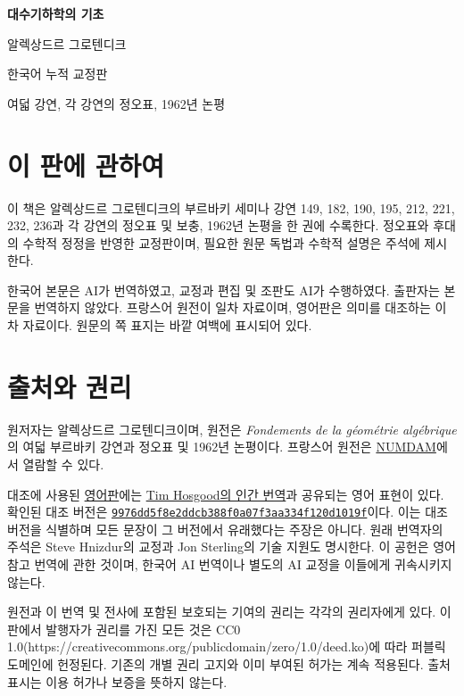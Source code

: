 \documentclass[11pt,twoside,openany]{book}
\numberwithin{equation}{section}
\theoremstyle{plain}
\theoremstyle{definition}
\theoremstyle{remark}
\begin{document}
\frontmatter
\begin{titlepage}
\centering
\vspace*{0.16\textheight}
{\Huge\bfseries 대수기하학의 기초\par}
\vspace{1.2\baselineskip}
{\Large 알렉상드르 그로텐디크\par}
\vfill
{\large 한국어 누적 교정판\par}
\vspace{0.5\baselineskip}
{\normalsize 여덟 강연, 각 강연의 정오표, 1962년 논평\par}
\end{titlepage}
\chapter*{이 판에 관하여}
이 책은 알렉상드르 그로텐디크의 부르바키 세미나 강연 149, 182, 190,
195, 212, 221, 232, 236과 각 강연의 정오표 및 보충, 1962년 논평을
한 권에 수록한다. 정오표와 후대의 수학적 정정을 반영한 교정판이며,
필요한 원문 독법과 수학적 설명은 주석에 제시한다.

한국어 본문은 AI가 번역하였고, 교정과 편집 및 조판도 AI가 수행하였다.
출판자는 본문을 번역하지 않았다. 프랑스어 원전이 일차 자료이며,
영어판은 의미를 대조하는 이차 자료이다. 원문의 쪽 표지는 바깥 여백에
표시되어 있다.
\clearpage

\chapter*{출처와 권리}
원저자는 알렉상드르 그로텐디크이며, 원전은
\emph{Fondements de la géométrie algébrique}의 여덟 부르바키 강연과
정오표 및 1962년 논평이다. 프랑스어 원전은
\href{https://www.numdam.org/}{NUMDAM}에서 열람할 수 있다.

대조에 사용된 \href{https://github.com/KokunoYumeto/fga-en}{영어판}에는
\href{https://github.com/thosgood/fga}{Tim Hosgood의 인간 번역}과 공유되는
영어 표현이 있다. 확인된 대조 버전은
\href{https://github.com/thosgood/fga/tree/9976dd5f8e2ddcb388f0a07f3aa334f120d1019f}{\nolinkurl{9976dd5f8e2ddcb388f0a07f3aa334f120d1019f}}이다.
이는 대조 버전을 식별하며 모든 문장이 그 버전에서 유래했다는 주장은 아니다.
원래 번역자의 주석은 Steve Hnizdur의 교정과 Jon Sterling의 기술 지원도
명시한다. 이 공헌은 영어 참고 번역에 관한 것이며, 한국어 AI 번역이나
별도의 AI 교정을 이들에게 귀속시키지 않는다.

원전과 이 번역 및 전사에 포함된 보호되는 기여의 권리는 각각의 권리자에게
있다. 이 판에서 발행자가 권리를 가진 모든 것은 CC0 1.0(https://creativecommons.org/publicdomain/zero/1.0/deed.ko)에 따라 퍼블릭 도메인에 헌정된다. 기존의 개별 권리 고지와 이미 부여된
허가는 계속 적용된다. 출처 표시는 이용 허가나 보증을 뜻하지 않는다.
\end{document}
